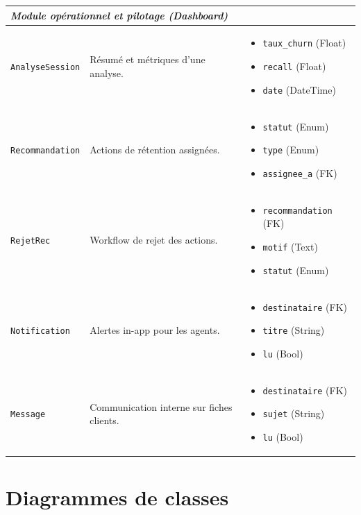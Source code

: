 \begin{footnotesize}
\begin{longtable}{|p{2.5cm}|p{4.5cm}|p{6cm}|}
    \multicolumn{3}{|l|}{\textit{Module opérationnel et pilotage (Dashboard)}} \\
    \hline
    \texttt{AnalyseSession} & Résumé et métriques d'une analyse. & \begin{itemize}[leftmargin=*, nosep] \item \texttt{taux\_churn} (Float) \item \texttt{recall} (Float) \item \texttt{date} (DateTime) \end{itemize} \\
    \hline
    \texttt{Recommandation} & Actions de rétention assignées. & \begin{itemize}[leftmargin=*, nosep] \item \texttt{statut} (Enum) \item \texttt{type} (Enum) \item \texttt{assignee\_a} (FK) \end{itemize} \\
    \hline
    \texttt{RejetRec} & Workflow de rejet des actions. & \begin{itemize}[leftmargin=*, nosep] \item \texttt{recommandation} (FK) \item \texttt{motif} (Text) \item \texttt{statut} (Enum) \end{itemize} \\
    \hline
    \texttt{Notification} & Alertes in-app pour les agents. & \begin{itemize}[leftmargin=*, nosep] \item \texttt{destinataire} (FK) \item \texttt{titre} (String) \item \texttt{lu} (Bool) \end{itemize} \\
    \hline
    \texttt{Message} & Communication interne sur fiches clients. & \begin{itemize}[leftmargin=*, nosep] \item \texttt{destinataire} (FK) \item \texttt{sujet} (String) \item \texttt{lu} (Bool) \end{itemize} \\
    \hline
\end{longtable}
\end{footnotesize}
  
\section{Diagrammes de classes}

